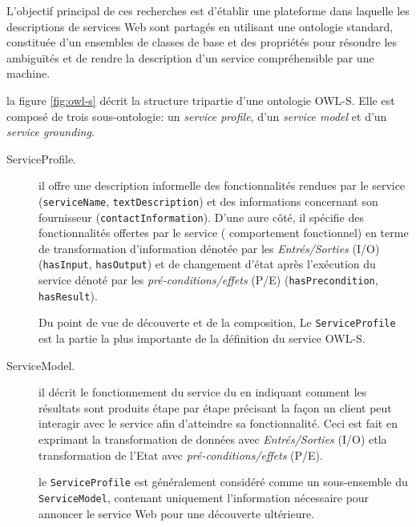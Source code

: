     L'objectif principal de ces recherches est d'établir une
    plateforme dans laquelle les descriptions de services Web sont
    partagés en utilisant une ontologie standard, constituée d'un
    ensembles de classes de base et des propriétés pour résoudre les
    ambiguïtés et de rendre la description d'un service compréhensible
    par une machine.

    la figure \ref{fig:owl-s} décrit la structure tripartie d'une
    ontologie \textsc{OWL-S}. Elle est composé de trois
    sous-ontologie: un \emph{service profile}, d'un \emph{service
      model} et d'un \emph{service grounding}.

    \renewcommand{\descriptionlabel}[1]{\hspace{1cm}\textbullet~\textsf{#1}}
    \begin{description}
      \item[ServiceProfile.] il offre une
        description informelle des fonctionnalités rendues par le
        service (\verb|serviceName|, \verb|textDescription|) et des
        informations concernant son fournisseur
        (\verb|contactInformation|). D'une aure côté, il spécifie des
        fonctionnalités offertes par le service ( comportement
        fonctionnel) en terme de transformation d'information dénotée
        par les \textit{Entrés/Sorties} \textsc{(I/O)}
        (\verb|hasInput|, \verb|hasOutput|) et de changement d'état
        après l'exécution du service dénoté par les
        \textit{pré-conditions/effets} \textsc{(P/E)}
        (\verb|hasPrecondition|, \verb|hasResult|).

      Du point de vue de découverte et de la composition, Le
      \verb|ServiceProfile| est la partie la plus importante de la
      définition du service \textsc{OWL-S}.

    \item[ServiceModel.] il décrit le fonctionnement du service du en
      indiquant comment les résultats sont produits étape par étape
      précisant la façon un client peut interagir avec le service afin
      d'atteindre sa fonctionnalité. Ceci est fait en exprimant la
      transformation de données avec \textit{Entrés/Sorties}
      \textsc{(I/O)} etla transformation de l'Etat avec
      \textit{pré-conditions/effets} \textsc{(P/E)}.

      le \verb|ServiceProfile| est généralement considéré comme un
      sous-ensemble du \verb|ServiceModel|, contenant uniquement
      l'information nécessaire pour annoncer le service Web pour une
      découverte ultérieure.


\end{description}
